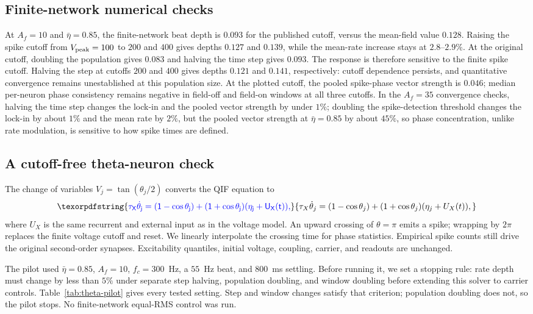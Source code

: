 \documentclass[11pt,a4paper]{article}
\newif\ifjne
\providecommand{\DIFaddtex}[1]{{\protect\color{blue} \sf #1}} %
\providecommand{\DIFaddbegin}{} %
\providecommand{\DIFadd}[1]{\texorpdfstring{\DIFaddtex{#1}}{#1}} %
\begin{document}
\subsection{Finite-network numerical checks}\label{app:qif-checks}
At $A_f=10$ and $\bar\eta=0.85$, the finite-network beat depth is $0.093$
for the published cutoff, versus the mean-field value $0.128$. Raising the spike cutoff from $V_{\rm peak}=100$ to
$200$ and $400$ gives depths $0.127$ and $0.139$, while the mean-rate increase
stays at $2.8$--$2.9\%$. At the original cutoff, doubling the population gives
$0.083$ and halving the time step gives $0.093$. The response is therefore
sensitive to the finite spike cutoff. Halving the step at cutoffs $200$ and
$400$ gives depths $0.121$ and $0.141$, respectively: cutoff dependence persists,
and quantitative convergence remains unestablished at this population size.
At the plotted cutoff, the pooled spike-phase vector strength is $0.046$;
median per-neuron phase consistency remains negative in field-off and field-on
windows at all three cutoffs.
In the $A_f=35$ convergence checks, halving the time step changes the lock-in and the pooled vector
strength by under $1\%$; doubling the spike-detection threshold changes the lock-in by
about $1\%$ and the mean rate by $2\%$, but the pooled vector strength at
$\bar\eta=0.85$ by about $45\%$, so phase concentration, unlike rate modulation, is sensitive to
how spike times are defined.


\DIFaddbegin \ifjne
\subsection{\DIFadd{A cutoff-free theta-neuron check}}\label{supp:theta-pilot}
\DIFadd{The change of variables $V_j=\tan(\theta_j/2)$ converts the QIF equation to
}\[
\DIFadd{\tau_X\dot\theta_j=(1-\cos\theta_j)
 +(1+\cos\theta_j)(\eta_j+U_X(t)),
}\]
\DIFadd{where $U_X$ is the same recurrent and external input as in the voltage model.
An upward crossing of $\theta=\pi$ emits a spike; wrapping by $2\pi$ replaces
the finite voltage cutoff and reset. We linearly interpolate the crossing
time for phase statistics. Empirical spike counts still drive the original
second-order synapses. Excitability quantiles, initial voltage, coupling,
carrier, and readouts are unchanged.
}

\DIFadd{The pilot used $\bar\eta=0.85$, $A_f=10$, $f_c=300$~Hz, a $55$~Hz beat,
and $800$~ms settling. Before running it, we set a stopping rule: rate depth
must change by less than $5\%$ under separate step halving, population
doubling, and window doubling before extending this solver to carrier controls.
Table~\ref{tab:theta-pilot} gives every tested setting. Step and window changes
satisfy that criterion; population doubling does not, so the pilot stops.
No finite-network equal-RMS control was run.
}
\end{document}
